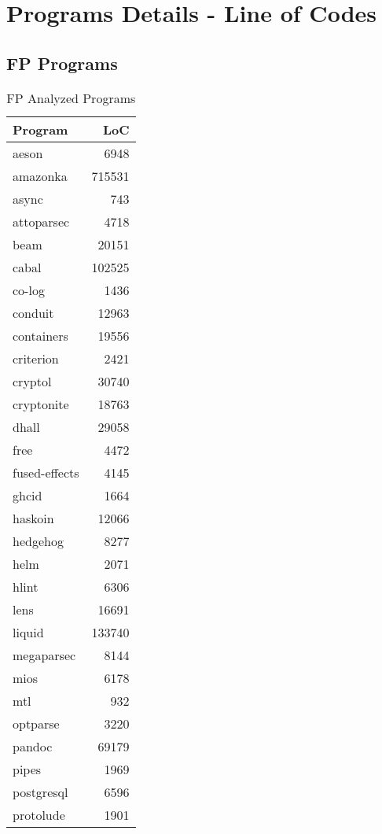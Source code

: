 \documentclass[12pt, a4paper]{article}
\begin{document}
\section{Programs Details - Line of Codes}
\subsection{FP Programs}
\begin{longtable}[H]{l r}
    \caption{FP Analyzed Programs}\label{table:ax_fp_prog_1}\\
        Program & LoC \\
        \hline            
        \endhead
        aeson & 6948 \\
        amazonka & 715531 \\
        async & 743 \\
        attoparsec & 4718 \\
        beam & 20151 \\
        cabal & 102525 \\
        co-log & 1436 \\
        conduit & 12963 \\
        containers & 19556 \\
        criterion & 2421 \\
        cryptol & 30740 \\
        cryptonite & 18763 \\
        dhall & 29058 \\
        free & 4472 \\
        fused-effects & 4145 \\
        ghcid & 1664 \\
        haskoin & 12066 \\
        hedgehog & 8277 \\
        helm & 2071 \\
        hlint & 6306 \\
        lens & 16691 \\
        liquid & 133740 \\
        megaparsec & 8144 \\
        mios & 6178 \\
        mtl & 932 \\
        optparse & 3220 \\
        pandoc & 69179 \\
        pipes & 1969 \\
        postgresql & 6596 \\
        protolude & 1901 \\

\end{longtable}
\end{document}

